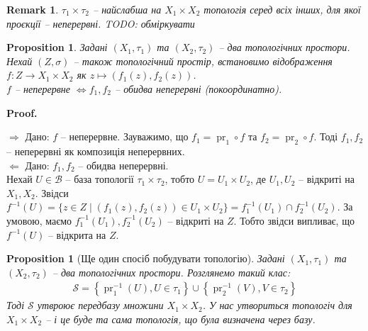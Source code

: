 \documentclass[a4paper, 10pt]{article}
\makeatletter
\def\rightproof{$\boxed{\Rightarrow}$ }
\def\leftproof{$\boxed{\Leftarrow}$ }
\theoremstyle{theoremdd}
\newtheorem{proposition}[theorem]{Proposition}
\newtheorem{remark}[theorem]{Remark}
\DeclareMathOperator{\pr}{pr}
\renewenvironment{proof}[1][Proof.\\]{\par
\pushQED{\hfill \qed}%
\normalfont \topsep6\p@\@plus6\p@\relax
\trivlist
\item\relax
{\bfseries
#1\@addpunct{.}}\hspace\labelsep\ignorespaces
}{%
\popQED\endtrivlist\@endpefalse
}
\makeatother
\begin{document}
\begin{remark}
$\tau_1 \times \tau_2$ -- найслабша на $X_1 \times X_2$ топологія серед всіх інших, для якої проєкції -- неперервні. \textit{TODO: обміркувати}
\end{remark}

\begin{proposition}
Задані $(X_1,\tau_1)$ та $(X_2,\tau_2)$ -- два топологічних простори. Нехай $(Z,\sigma)$ -- також топологічний простір, встановимо відображення $f \colon Z \to X_1 \times X_2$ як $z \mapsto (f_1(z),f_2(z))$.\\
$f$ -- неперервне $\iff f_1,f_2$ -- обидва неперервні (покоординатно).
\end{proposition}

\begin{proof}
\rightproof Дано: $f$ -- неперервне. Зауважимо, що $f_1 = \pr_1 \circ f$ та $f_2 = \pr_2 \circ f$. Тоді $f_1,f_2$ -- неперервні як композиція неперервних.
\bigskip \\
\leftproof Дано: $f_1,f_2$ -- обидва неперервні.\\
Нехай $U \in \mathcal{B}$ -- база топології $\tau_1 \times \tau_2$, тобто $U = U_1 \times U_2$, де $U_1,U_2$ -- відкриті на $X_1,X_2$. Звідси $f^{-1}(U) = \{ z \in Z \mid (f_1(z),f_2(z)) \in U_1 \times U_2\} = f_1^{-1}(U_1) \cap f_2^{-1}(U_2)$. За умовою, маємо $f_1^{-1}(U_1), f_2^{-1}(U_2)$ -- відкриті на $Z$. Тобто звідси випливає, що $f^{-1}(U)$ -- відкрита на $Z$.
\end{proof}

\begin{proposition}[Ще один спосіб побудувати топологію]
Задані $(X_1,\tau_1)$ та $(X_2,\tau_2)$ -- два топологічних простори. Розглянемо такий клас:
\begin{align*}
\mathcal{S} = \left\{ \pr_1^{-1}(U), U \in \tau_1 \right\} \cup \left\{ \pr_2^{-1}(V), V \in \tau_2 \right\}
\end{align*}
Тоді $\mathcal{S}$ утвроює передбазу множини $X_1 \times X_2$. У нас утвориться топологіч для $X_1 \times X_2$ -- і це буде та сама топологія, що була визначена через базу.
\end{proposition}
\end{document}
